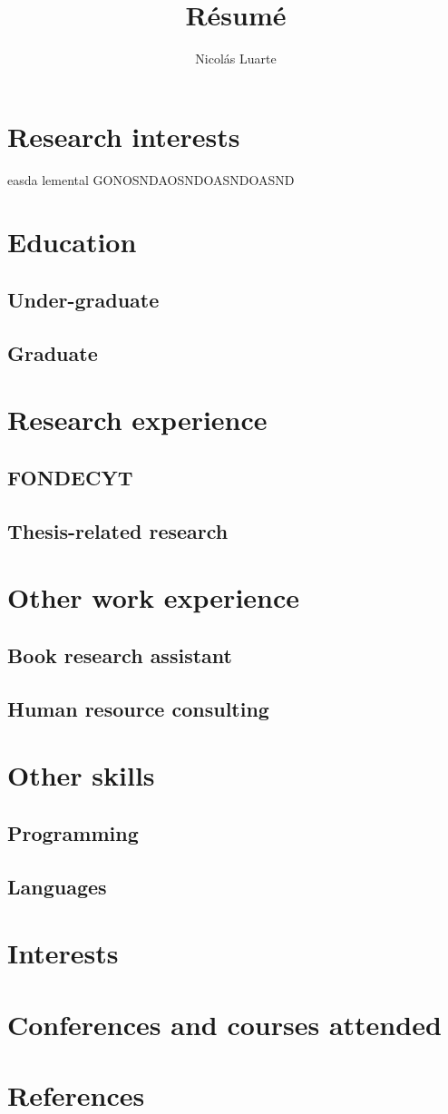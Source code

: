 \documentclass{article}
\begin{document}
\title{R\'esum\'e}
\author{Nicolás Luarte}


\maketitle
\section{Research interests}
easda
lemental GONOSNDAOSNDOASNDOASND
\section{Education}
\blindtext
\subsection{Under-graduate}
\blindtext
\subsection{Graduate}
\blindtext
\section{Research experience}
\blindtext
\subsection{FONDECYT}
\blindtext
\subsection{Thesis-related research}
\blindtext
\section{Other work experience}
\blindtext
\subsection{Book research assistant}
\blindtext
\subsection{Human resource consulting}
\blindtext  
\section{Other skills}
\blindtext
\subsection{Programming}
\blindtext
\subsection{Languages}
\blindtext
\section{Interests}
\blindtext
\section{Conferences and courses attended}
\blindtext
\section{References}
\blindtext
\end{document}
